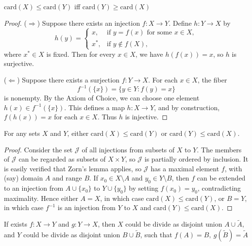 \begin{prop}
$\mathrm{card}(X) \le \mathrm{card}(Y)$ iff $\mathrm{card}(Y) \ge \mathrm{card}(X)$
\end{prop}

\begin{proof}
($\Rightarrow$) Suppose there exists an injection $f:X \to Y$. 
Define $h:Y \to X$ by
\[
   h(y) = 
   \begin{cases}
      x, & \text{if } y = f(x) \text{ for some } x \in X, \\
      x^*, & \text{if } y \notin f(X),
   \end{cases}
\]
where $x^*\in X$ is fixed. Then for every $x\in X$, we have $h(f(x))=x$, so $h$ is surjective.


($\Leftarrow$) Suppose there exists a surjection $f:Y \to X$. 
For each $x\in X$, the fiber 
\[
   f^{-1}(\{x\}) = \{ y \in Y : f(y)=x\}
\]
is nonempty. By the Axiom of Choice, we can choose one element $h(x)\in f^{-1}(\{x\})$. 
This defines a map $h:X \to Y$, and by construction, $f(h(x))=x$ for each $x\in X$. 
Thus $h$ is injective.
\end{proof}

\begin{prop}
For any sets $X$ and $Y$, either $\mathrm{card}(X) \leq \mathrm{card}(Y)$ or 
$\mathrm{card}(Y) \leq \mathrm{card}(X)$.
\end{prop}

\begin{proof}
Consider the set $\mathcal{J}$ of all injections from subsets of $X$ to $Y$. 
The members of $\mathcal{J}$ can be regarded as subsets of $X \times Y$, so 
$\mathcal{J}$ is partially ordered by inclusion. It is easily verified that 
Zorn's lemma applies, so $\mathcal{J}$ has a maximal element $f$, with (say) 
domain $A$ and range $B$. If $x_0 \in X \setminus A$ and $y_0 \in Y \setminus B$, 
then $f$ can be extended to an injection from $A \cup \{x_0\}$ to 
$Y \cup \{y_0\}$ by setting $f(x_0) = y_0$, contradicting maximality. 
Hence either $A = X$, in which case $\mathrm{card}(X) \leq \mathrm{card}(Y)$, 
or $B = Y$, in which case $f^{-1}$ is an injection from $Y$ to $X$ and 
$\mathrm{card}(Y) \leq \mathrm{card}(X)$.
\end{proof}

\begin{thm}\label{5dd1cdb2}
    If exists $f: X \to Y$ and $g: Y \to X$, then $X$ could be divide as disjoint union $A \cup \tilde{A}$, and 
    $Y$ could be divide as disjoint union $B \cup \tilde{B}$, such that $f(A) = B,\: g(\tilde{B}) = \tilde{A}$
\end{thm}

